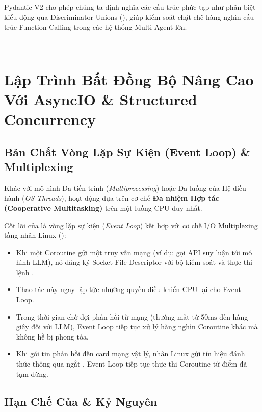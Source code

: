 Pydantic V2 cho phép chúng ta định nghĩa các cấu trúc phức tạp như phân biệt kiểu động qua Discriminator Unions (), giúp kiểm soát chặt chẽ hàng nghìn cấu trúc Function Calling trong các hệ thống Multi-Agent lớn.

---

\section{Lập Trình Bất Đồng Bộ Nâng Cao Với AsyncIO \& Structured Concurrency}
\label{sec:asyncio-mastery}

\subsection{Bản Chất Vòng Lặp Sự Kiện (Event Loop) \& Multiplexing}

Khác với mô hình Đa tiến trình (\textit{Multiprocessing}) hoặc Đa luồng của Hệ điều hành (\textit{OS Threads}),  hoạt động dựa trên cơ chế \textbf{Đa nhiệm Hợp tác (Cooperative Multitasking)} trên một luồng CPU duy nhất.

Cốt lõi của  là vòng lặp sự kiện (\textit{Event Loop}) kết hợp với cơ chế I/O Multiplexing tầng nhân Linux ():
\begin{itemize}
  \item Khi một Coroutine gửi một truy vấn mạng (ví dụ: gọi API suy luận tới mô hình LLM), nó đăng ký Socket File Descriptor với bộ kiểm soát  và thực thi lệnh .
  \item Thao tác này ngay lập tức nhường quyền điều khiển CPU lại cho Event Loop.
  \item Trong thời gian chờ đợi phản hồi từ mạng (thường mất từ $50\text{ms}$ đến hàng giây đối với LLM), Event Loop tiếp tục xử lý hàng nghìn Coroutine khác mà không hề bị phong tỏa.
  \item Khi gói tin phản hồi đến card mạng vật lý, nhân Linux gửi tín hiệu đánh thức thông qua ngắt , Event Loop tiếp tục thực thi Coroutine từ điểm đã tạm dừng.
\end{itemize}

\subsection{Hạn Chế Của  \& Kỷ Nguyên }

